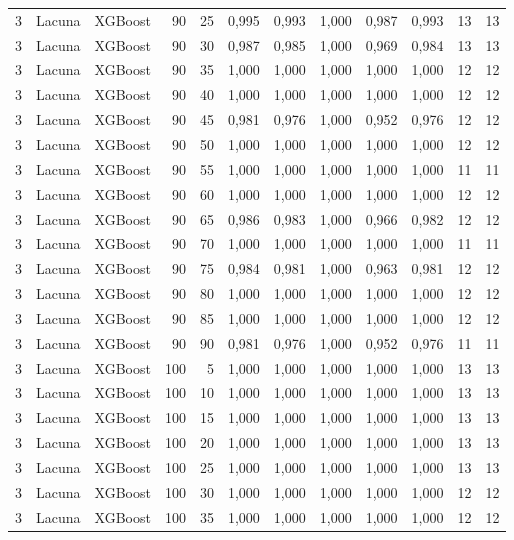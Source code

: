 \begin{longtable}{@{}rllrrrrrrrrr@{}}
3 & Lacuna & XGBoost & 90 & 25 & 0,995 & 0,993 & 1,000 & 0,987 & 0,993 & 13 & 13 \\
3 & Lacuna & XGBoost & 90 & 30 & 0,987 & 0,985 & 1,000 & 0,969 & 0,984 & 13 & 13 \\
3 & Lacuna & XGBoost & 90 & 35 & 1,000 & 1,000 & 1,000 & 1,000 & 1,000 & 12 & 12 \\
3 & Lacuna & XGBoost & 90 & 40 & 1,000 & 1,000 & 1,000 & 1,000 & 1,000 & 12 & 12 \\
3 & Lacuna & XGBoost & 90 & 45 & 0,981 & 0,976 & 1,000 & 0,952 & 0,976 & 12 & 12 \\
3 & Lacuna & XGBoost & 90 & 50 & 1,000 & 1,000 & 1,000 & 1,000 & 1,000 & 12 & 12 \\
3 & Lacuna & XGBoost & 90 & 55 & 1,000 & 1,000 & 1,000 & 1,000 & 1,000 & 11 & 11 \\
3 & Lacuna & XGBoost & 90 & 60 & 1,000 & 1,000 & 1,000 & 1,000 & 1,000 & 12 & 12 \\
3 & Lacuna & XGBoost & 90 & 65 & 0,986 & 0,983 & 1,000 & 0,966 & 0,982 & 12 & 12 \\
3 & Lacuna & XGBoost & 90 & 70 & 1,000 & 1,000 & 1,000 & 1,000 & 1,000 & 11 & 11 \\
3 & Lacuna & XGBoost & 90 & 75 & 0,984 & 0,981 & 1,000 & 0,963 & 0,981 & 12 & 12 \\
3 & Lacuna & XGBoost & 90 & 80 & 1,000 & 1,000 & 1,000 & 1,000 & 1,000 & 12 & 12 \\
3 & Lacuna & XGBoost & 90 & 85 & 1,000 & 1,000 & 1,000 & 1,000 & 1,000 & 12 & 12 \\
3 & Lacuna & XGBoost & 90 & 90 & 0,981 & 0,976 & 1,000 & 0,952 & 0,976 & 11 & 11 \\
3 & Lacuna & XGBoost & 100 & 5 & 1,000 & 1,000 & 1,000 & 1,000 & 1,000 & 13 & 13 \\
3 & Lacuna & XGBoost & 100 & 10 & 1,000 & 1,000 & 1,000 & 1,000 & 1,000 & 13 & 13 \\
3 & Lacuna & XGBoost & 100 & 15 & 1,000 & 1,000 & 1,000 & 1,000 & 1,000 & 13 & 13 \\
3 & Lacuna & XGBoost & 100 & 20 & 1,000 & 1,000 & 1,000 & 1,000 & 1,000 & 13 & 13 \\
3 & Lacuna & XGBoost & 100 & 25 & 1,000 & 1,000 & 1,000 & 1,000 & 1,000 & 13 & 13 \\
3 & Lacuna & XGBoost & 100 & 30 & 1,000 & 1,000 & 1,000 & 1,000 & 1,000 & 12 & 12 \\
3 & Lacuna & XGBoost & 100 & 35 & 1,000 & 1,000 & 1,000 & 1,000 & 1,000 & 12 & 12 \\

\end{longtable}

